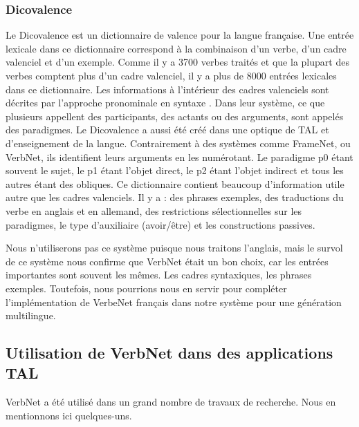 \subsubsection{Dicovalence}
Le Dicovalence est un dictionnaire de valence pour la langue française. Une entrée lexicale dans ce dictionnaire correspond à la combinaison d'un verbe, d'un cadre valenciel et d'un exemple. Comme il y a 3700 verbes traités et que la plupart des verbes comptent plus d'un cadre valenciel, il y a plus de 8000 entrées lexicales dans ce dictionnaire. Les informations à l'intérieur des cadres valenciels sont décrites par l'approche pronominale en syntaxe \citep{11403/dicovalence/v1}. Dans leur système, ce que plusieurs appellent des participants, des actants ou des arguments, sont appelés des paradigmes. Le Dicovalence a aussi été créé dans une optique de TAL et d'enseignement de la langue. Contrairement à des systèmes comme FrameNet, ou VerbNet, ils identifient leurs arguments en les numérotant. Le paradigme p0 étant souvent le sujet, le p1 étant l'objet direct, le p2 étant l'objet indirect et tous les autres étant des obliques. Ce dictionnaire contient beaucoup d'information utile autre que les cadres valenciels. Il y a : des phrases exemples, des traductions du verbe en anglais et en allemand, des restrictions sélectionnelles sur les paradigmes, le type d'auxiliaire (avoir/être) et les constructions passives.

Nous n'utiliserons pas ce système puisque nous traitons l'anglais, mais le survol de ce système nous confirme que VerbNet était un bon choix, car les entrées importantes sont souvent les mêmes. Les cadres syntaxiques, les phrases exemples. Toutefois, nous pourrions nous en servir pour compléter l'implémentation de VerbeNet français dans notre système pour une génération multilingue.


\subsection {Utilisation de VerbNet dans des applications TAL}

VerbNet a été utilisé dans un grand nombre de travaux de recherche. Nous en mentionnons ici quelques-uns.

